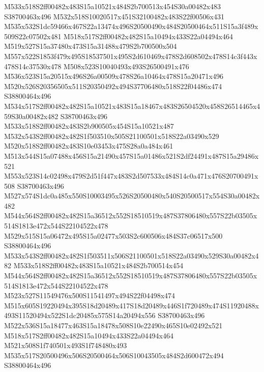 \documentclass{article}
\begin{document}
\begin{multicols}{2}


M533x518S2ff00482x483S15a10521x484S2b700513x454S30a00482x483 S38700463x496 M532x518S10020517x451S32100482x483S22f00506x431 M535x532S1dc59466x467S22a13474x496S20500490x484S20500464x511S15a3f489x509S22c07502x481 M518x517S2ff00482x482S15a10494x433S22a04494x464 M519x527S15a37480x473S15a31488x479S2b700500x504 M557x522S1853f479x495S18537501x495S2d610469x478S2d608502x478S14c3f443x478S14c37530x478 M508x523S10040493x493S26500491x476 M536x523S15a20515x496S26a00509x478S26a10464x478S15a20471x496 M520x526S20356505x511S20350492x494S37706480x518S22f04486x474 S38800464x496 M534x517S2ff00482x482S15a10521x483S15a18467x483S26504520x458S26514465x459S30a00482x482 S38700463x496 M533x518S2ff00482x483S2b900505x454S15a10521x487 M532x543S2ff00482x482S1f503510x505S21100501x518S22a03490x529 M520x518S2ff00482x483S10e03453x475S28a0a484x461 M513x544S15a07488x456S15a21490x457S15a01486x521S2df24491x487S15a29486x521 M553x523S14c02498x479S2d51f447x483S2d507533x484S14c0a471x476S20700491x508 S38700463x496 M527x574S1dc0a485x550S10003495x526S20500480x540S20500517x554S30a00482x482 M544x564S2ff00482x482S15a36512x552S18510519x487S37806480x557S22b03505x514S1813e472x544S22104522x478 M529x515S15a06472x495S15a02477x503S2c600506x484S37c06517x500 S38800464x496 M533x543S2ff00482x482S1f503511x506S21100501x518S22a03490x529S30a00482x482 M533x518S2ff00482x483S15a10521x484S2b700514x454 M544x564S2ff00482x482S15a36512x552S18510519x487S37806480x557S22b03505x514S1813e472x544S22104522x478 M523x527S11549476x500S11541497x494S22f04498x474 M515x605S19220494x395S18d20489x417S18d20489x446S1f720489x474S11920488x493S11520494x522S1dc20485x575S14a20494x556 S38700463x496 M522x536S15a18477x463S15a18478x508S10e22490x465S10e02492x521 M518x517S2ff00482x482S15a10494x433S22a04494x464 M521x508S1f740501x493S1f748480x493 M535x517S20500496x506S20500464x506S10043505x484S2d600472x494 S38800464x496




\end{multicols}
\end{document}
